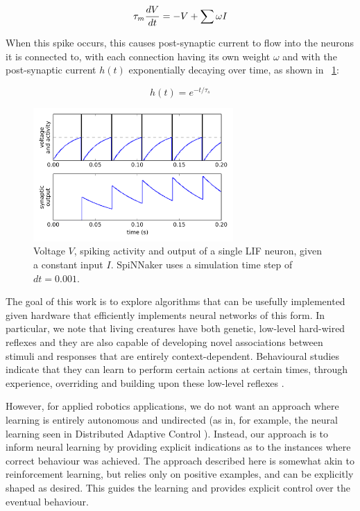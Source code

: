 \documentclass{frontiersSCNS}
\begin{document}
\begin{equation}
    \tau_m {dV \over dt} = -V + \sum \omega I
\end{equation}

When this spike occurs, this causes post-synaptic current to flow into the 
neurons it is connected to, with each connection having its own weight $\omega$
and with the post-synaptic current $h(t)$ exponentially decaying over time, 
as shown in \figurename~\ref{Neuron}:

\begin{equation}
    h(t) = e^{-t/\tau_s}
\end{equation}

\begin{figure}[!t]
\centering
\includegraphics[width=3in]{../figures/neuron.png}
\caption{Voltage $V$, spiking activity and output of a single LIF neuron, given a constant input $I$.
SpiNNaker uses a simulation time step of $dt=0.001$.}
\label{Neuron}
\end{figure}

The goal of this work is to explore algorithms that can be usefully implemented
given hardware that efficiently implements neural networks of this form.  In
particular, we note that living creatures have both genetic, low-level 
hard-wired reflexes and they are also capable of developing novel associations 
between stimuli and responses that are entirely context-dependent. Behavioural 
studies indicate that they can learn to perform certain actions at certain 
times, through experience, overriding and building upon these low-level 
reflexes \citep{kim2007encoding}. 

However, for applied robotics applications, we do not want an approach where
learning is entirely autonomous and undirected (as in, for example, the neural
learning seen in Distributed Adaptive Control \citep{verschure2012distributed}). 
Instead, our approach is to inform neural learning by providing explicit
indications as to the instances where correct behaviour was achieved.  The 
approach described here is somewhat akin to reinforcement learning, but relies
only on positive examples, and can be explicitly shaped as desired.  This 
guides the learning and provides explicit control over the eventual behaviour. 
\end{document}

